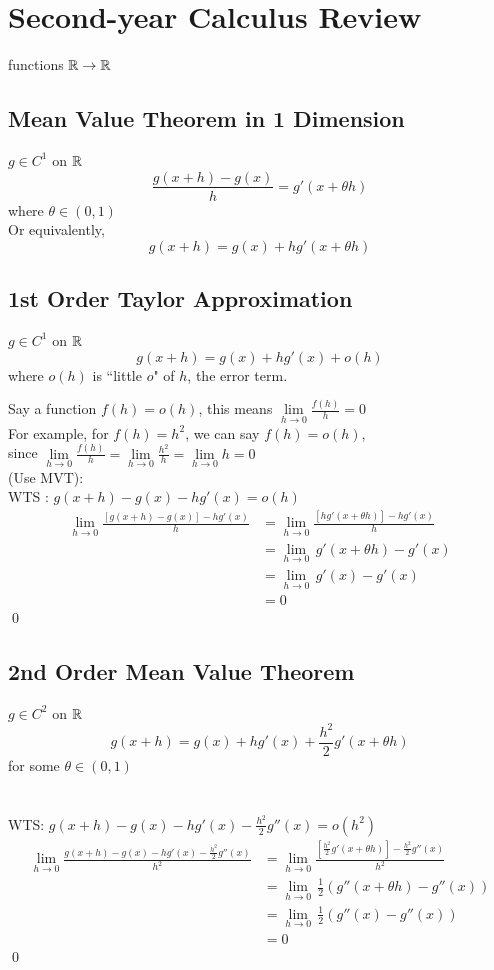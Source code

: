 \documentclass[11pt]{article}
\begin{document}
\section{Second-year Calculus Review}
functions $\mathbb{R} \rightarrow \mathbb{R}$
\subsection{Mean Value Theorem in 1 Dimension}
$g \in C^1$ on $\mathbb{R}$
$$\frac{g(x+h) - g(x)}{h} = g'(x + \theta h)$$
where $\theta \in (0,1)$ \\
Or equivalently,
$$g(x+h) = g(x) + hg'(x+\theta h)$$

\subsection{1st Order Taylor Approximation}
$g \in C^1$ on $\mathbb{R}$
$$g(x + h) = g(x) + hg'(x) + o(h)$$
where $o(h)$ is ``little $o$" of $h$, the error term.

\noindent Say a function $f(h) = o(h)$, this means $\underset{h \rightarrow 0}{\lim} \frac{f(h)}{h} = 0$\\
For example, for $f(h) = h^2$, we can say $f(h) = o(h)$, \\
since $\underset{h \rightarrow 0}{\lim} \frac{f(h)}{h} = \underset{h \rightarrow 0}{\lim} \frac{h^2}{h} = \underset{h \rightarrow 0}{\lim} h = 0$\\
 (Use MVT): \\
WTS : $g(x+h) - g(x) - hg'(x) = o(h)$
\begin{align*}
	\underset{h \rightarrow 0}{\lim} \frac{[g(x+h) - g(x)] - hg'(x)}{h} &= \underset{h \rightarrow 0}{\lim} \frac{[hg'(x+\theta h)] - hg'(x)}{h} \\
	&=\underset{h \rightarrow 0}{\lim} \, g'(x + \theta h) - g'(x) \\
	&=\underset{h \rightarrow 0}{\lim} \, g'(x) - g'(x) \\
	&= 0
\end{align*}
\qed

\subsection{2nd Order Mean Value Theorem}
$g \in C^2$ on $\mathbb{R}$
$$g(x + h) = g(x) + hg'(x) + \frac{h^2}{2} g'(x+\theta h)$$
for some $\theta \in (0,1)$ \\\\
 \\
WTS: $g(x+h) - g(x) - hg'(x) - \frac{h^2}{2}g''(x) = o(h^2)$
\begin{align*}
	\underset{h \rightarrow 0}{\lim} \frac{g(x+h) - g(x) - hg'(x) - \frac{h^2}{2}g''(x)}{h^2}
	&= \underset{h \rightarrow 0}{\lim} \frac{[\frac{h^2}{2}g'(x+\theta h)] - \frac{h^2}{2}g''(x)}{h^2}\\
	&=\underset{h \rightarrow 0}{\lim}\, \frac{1}{2}(g''(x+\theta h) - g''(x)) \\
	&=\underset{h \rightarrow 0}{\lim}\, \frac{1}{2}(g''(x) - g''(x)) \\
	&= 0
\end{align*}
\qed
\end{document}
